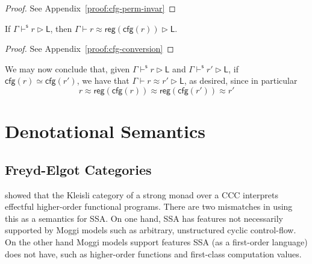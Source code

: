\documentclass[acmsmall,screen,review]{acmart}
\newcommand{\ms}[1]{\ensuremath{\mathsf{#1}}}
\newcommand{\shaslb}[3]{#1 \vdash^{\ms{s}} #2 \rhd #3}
\newcommand{\teqv}{\approx}
\newcommand{\lbeq}[4]{#1 \vdash #2 \teqv #3 \rhd {#4}}
\newcommand{\tocfg}[1]{\ms{cfg}(#1)}
\newcommand{\toreg}[1]{\ms{reg}(#1)}
\begin{document}
\begin{proof}
  See Appendix~\ref{proof:cfg-perm-invar}
\end{proof}
\begin{lemma}[name=CFG Conversion, restate=cfgconversion]
  If $\shaslb{\Gamma}{r}{\ms{L}}$, then $\lbeq{\Gamma}{r}{\toreg{\tocfg{r}}}{\ms{L}}$.
\end{lemma}
\begin{proof}
  See Appendix~\ref{proof:cfg-conversion}
\end{proof}

We may now conclude that, given $\shaslb{\Gamma}{r}{\ms{L}}$ and $\shaslb{\Gamma}{r'}{\ms{L}}$, if
$\tocfg{r} \simeq \tocfg{r'}$, we have that $\lbeq{\Gamma}{r}{r'}{\ms{L}}$, as desired, since in
particular
\begin{equation}
  r \teqv \toreg{\tocfg{r}} \teqv \toreg{\tocfg{r'}} \teqv r'
\end{equation}

\section{Denotational Semantics}

\label{sec:densem}

\subsection{Freyd-Elgot Categories}

\citet{moggi-91-monad} showed that the Kleisli category of a strong monad over a CCC interprets
effectful higher-order functional programs. There are two mismatches in using this as a semantics
for SSA. 
%
On one hand, SSA has features not necessarily supported by Moggi models such as arbitrary,
unstructured cyclic control-flow. 
%
On the other hand Moggi models support features SSA (as a first-order language) does not have, such
as higher-order functions and first-class computation values.
\end{document}
